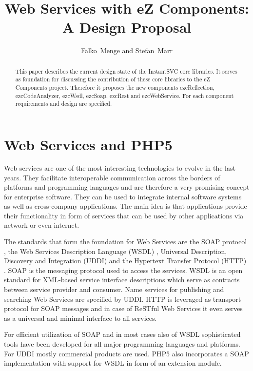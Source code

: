 \documentclass[10pt,final,a4paper,oneside]{article}
\begin{document}
\title{Web Services with eZ Components:\\ A Design Proposal}
\author{Falko~Menge and Stefan~Marr}

\maketitle


\begin{abstract}
This paper describes the current design state
of the InstantSVC core libraries.
It serves as foundation for discussing the contribution
of these core libraries to the eZ Components project.
Therefore it proposes the new components
ezcReflection, ezcCodeAnalyzer, ezcWsdl, ezcSoap, ezcRest and ezcWebService.
For each component requirements and design are specified.
\end{abstract}

\section{Web Services and PHP5}\label{sec:Introduction}
Web services are one of the most interesting technologies to evolve in the
last years. They facilitate interoperable communication across the borders of 
platforms and programming languages and are therefore a very 
promising concept for enterprise software. They can be used to integrate 
internal software systems as well as cross-company applications. The main idea is that 
applications provide their functionality in form of services that can be 
used by other applications via network or even internet. 

The standards that form the foundation for Web Services are the SOAP
protocol \cite{SOAP}, the Web Services Description Language (WSDL) \cite{WSDL},
Universal Description, Discovery and Integration (UDDI) \cite{UDDI} and the
Hypertext Transfer Protocol (HTTP) \cite{HTTP}.
SOAP is the messaging protocol used to access the services. WSDL is an
open standard for XML-based service interface descriptions which serve as
contracts between service provider and consumer. Name services for
publishing and searching Web Services are specified by UDDI. HTTP is
leveraged as transport protocol for SOAP messages and in case of ReSTful
Web Services it even serves as a universal and minimal interface to all
services.

For efficient utilization of SOAP and in most cases also of WSDL
sophisticated tools have been developed for all major programming
languages and platforms. For UDDI mostly commercial products are used.
PHP5 also incorporates a SOAP implementation with support for WSDL
in form of an extension module.
\end{document}
